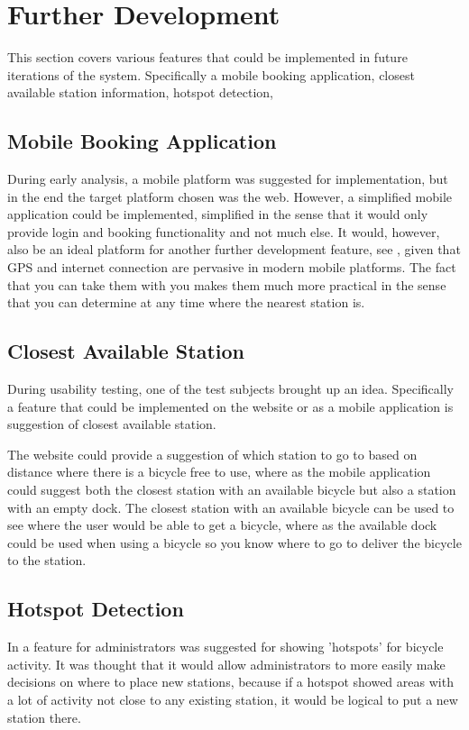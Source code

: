 \section{Further Development}
This section covers various features that could be implemented in future iterations of the system. Specifically a mobile booking application, closest available station information, hotspot detection,

\subsection{Mobile Booking Application}\label{sec:fd-mobileapp}
During early analysis, a mobile platform was suggested for implementation, but in the end the target platform chosen was the web. 
However, a simplified mobile application could be implemented, simplified in the sense that it would only provide login and booking functionality and not much else.
It would, however, also be an ideal platform for another further development feature, see , given that GPS and internet connection are pervasive in modern mobile platforms.
The fact that you can take them with you makes them much more practical in the sense that you can determine at any time where the nearest station is.

\subsection{Closest Available Station}\label{subsec:closeststation}
During usability testing, one of the test subjects brought up an idea.
Specifically a feature that could be implemented on the website or as a mobile application is suggestion of closest available station.

The website could provide a suggestion of which station to go to based on distance where there is a bicycle free to use, where as the mobile application could suggest both the closest station with an available bicycle but also a station with an empty dock.
The closest station with an available bicycle can be used to see where the user would be able to get a bicycle, where as the available dock could be used when using a bicycle so you know where to go to deliver the bicycle to the station.

\subsection{Hotspot Detection}
In  a feature for administrators was suggested for showing 'hotspots' for bicycle activity. 
It was thought that it would allow administrators to more easily make decisions on where to place new stations, because if a hotspot showed areas with a lot of activity not close to any existing station, it would be logical to put a new station there.

